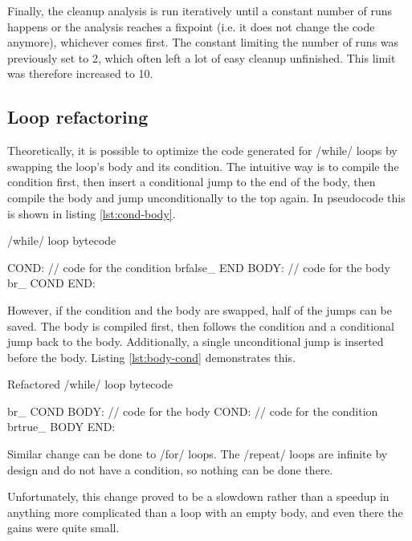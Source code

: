 Finally, the cleanup analysis is run iteratively until a constant number of runs happens or the analysis reaches a fixpoint (i.e. it does not change the code anymore), whichever comes first. The constant limiting the number of runs was previously set to 2, which often left a lot of easy cleanup unfinished. This limit was therefore increased to 10.


\subsection{Loop refactoring}

Theoretically, it is possible to optimize the code generated for \rinline/while/ loops by swapping the loop's body and its condition. The intuitive way is to compile the condition first, then insert a conditional jump to the end of the body, then compile the body and jump unconditionally to the top again. In pseudocode this is shown in listing \ref{lst:cond-body}.

\begin{listing}[htbp]
  \caption{\label{lst:cond-body}\rinline/while/ loop bytecode}
  \begin{ccode}
COND:
    // code for the condition
    brfalse_ END
BODY:
    // code for the body
    br_ COND
END:
  \end{ccode}
\end{listing}

However, if the condition and the body are swapped, half of the jumps can be saved. The body is compiled first, then follows the condition and a conditional jump back to the body. Additionally, a single unconditional jump is inserted before the body. Listing \ref{lst:body-cond} demonstrates this.

\begin{listing}[htbp]
  \caption{\label{lst:body-cond}Refactored \rinline/while/ loop bytecode}
  \begin{ccode}
    br_ COND
BODY:
    // code for the body
COND:
    // code for the condition
    brtrue_ BODY
END:
  \end{ccode}
\end{listing}

Similar change can be done to \rinline/for/ loops. The \rinline/repeat/ loops are infinite by design and do not have a condition, so nothing can be done there.

Unfortunately, this change proved to be a slowdown rather than a speedup in anything more complicated than a loop with an empty body, and even there the gains were quite small.

